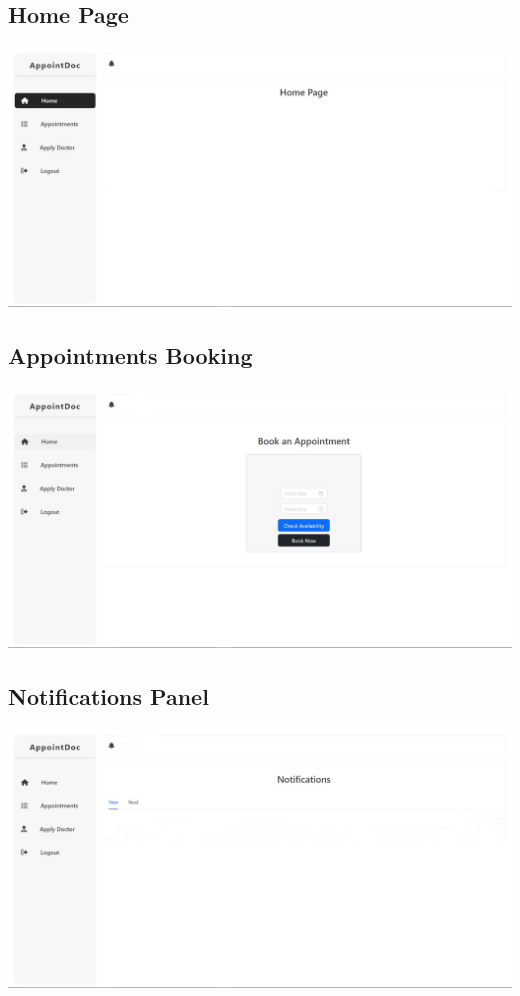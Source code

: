 \documentclass[a4paper, 12pt]{article}
\begin{document}
\subsection{Home Page}
\begin{center}
\includegraphics[width=1\textwidth]{home.jpg}\par
\end{center}

\subsection{Appointments Booking}
\begin{center}
\includegraphics[width=1\textwidth]{login.jpg}\par
\end{center}

\subsection{Notifications Panel}
\begin{center}
\includegraphics[width=1\textwidth]{noti.jpg}\par
\end{center}
\end{document}
